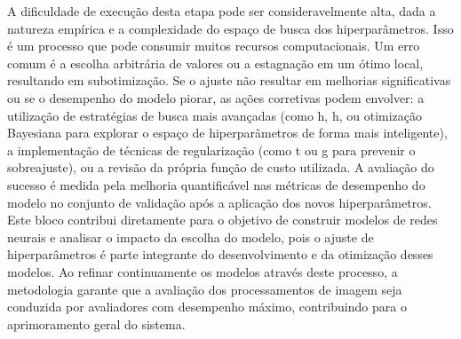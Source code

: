 A dificuldade de execução desta etapa pode ser consideravelmente alta, dada a natureza empírica e a complexidade do espaço de busca dos hiperparâmetros. Isso é um processo que pode consumir muitos recursos computacionais. Um erro comum é a escolha arbitrária de valores ou a estagnação em um ótimo local, resultando em subotimização. Se o ajuste não resultar em melhorias significativas ou se o desempenho do modelo piorar, as ações corretivas podem envolver: a utilização de estratégias de busca mais avançadas (como h, h, ou otimização Bayesiana para explorar o espaço de hiperparâmetros de forma mais inteligente), a implementação de técnicas de regularização (como t ou g para prevenir o sobreajuste), ou a revisão da própria função de custo utilizada. A avaliação do sucesso é medida pela melhoria quantificável nas métricas de desempenho do modelo no conjunto de validação após a aplicação dos novos hiperparâmetros. Este bloco contribui diretamente para o objetivo de construir modelos de redes neurais e analisar o impacto da escolha do modelo, pois o ajuste de hiperparâmetros é parte integrante do desenvolvimento e da otimização desses modelos. Ao refinar continuamente os modelos através deste processo, a metodologia garante que a avaliação dos processamentos de imagem seja conduzida por avaliadores com desempenho máximo, contribuindo para o aprimoramento geral do sistema.